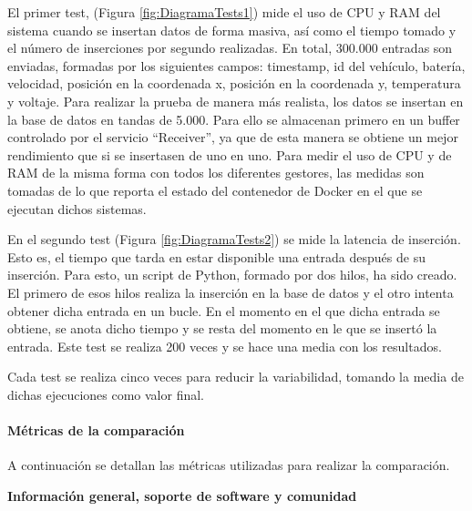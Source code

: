 
El primer test, (Figura \ref{fig:DiagramaTests1}) mide el uso de CPU y RAM del sistema cuando se insertan datos de forma
masiva, así como el tiempo tomado y el número de inserciones por segundo realizadas. En total, 300.000 entradas son enviadas,
formadas por los siguientes campos: timestamp, id del vehículo, batería, velocidad, posición en la coordenada x, posición
en la coordenada y, temperatura y voltaje. Para realizar la prueba de manera más realista, los datos se insertan en la
base de datos en tandas de 5.000. Para ello se almacenan primero en un buffer controlado por el servicio ``Receiver'', ya
que de esta manera se obtiene un mejor rendimiento que si se insertasen de uno en uno. Para medir el uso de CPU y de RAM
de la misma forma con todos los diferentes gestores, las medidas son tomadas de lo que reporta el estado del contenedor
de Docker en el que se ejecutan dichos sistemas.

En el segundo test (Figura \ref*{fig:DiagramaTests2}) se mide la latencia de inserción. Esto es, el tiempo que tarda
en estar disponible una entrada después de su inserción. Para esto, un script de Python, formado por dos hilos, ha sido creado.
El primero de esos hilos realiza la inserción en la base de datos y el otro intenta obtener dicha entrada en un bucle.
En el momento en el que dicha entrada se obtiene, se anota dicho tiempo y se resta del momento en le que se insertó
la entrada. Este test se realiza 200 veces y se hace una media con los resultados.

Cada test se realiza cinco veces para reducir la variabilidad, tomando la media de dichas ejecuciones como valor final.

\paragraph*{Métricas de la comparación} 
A continuación se detallan las métricas utilizadas para realizar la comparación.

\textbf{Información general, soporte de software y comunidad}

